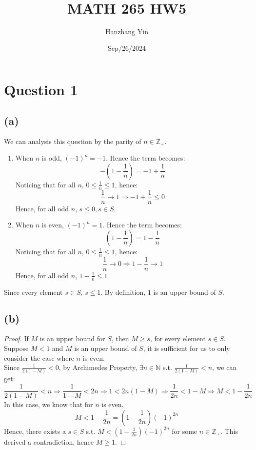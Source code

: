 \documentclass{article}
\title{MATH 265 HW5}
\author{Hanzhang Yin}
\date{Sep/26/2024}
\begin{document}
\maketitle

\section*{Question 1}

\subsection*{(a)}
We can analysis this question by the parity of $n \in \mathbb{Z}_{+}$.
\begin{enumerate}
    \item When $n$ is odd, \((-1)^n = -1 \). Hence the term becomes:
    \[ - \left( 1 - \frac{1}{n} \right) = -1 + \frac{1}{n} \]
    Noticing that for all $n$, $0 \leq \frac{1}{n} \leq 1$, hence:
    \[ \frac{1}{n} \rightarrow 1 \Rightarrow -1 + \frac{1}{n} \leq 0 \]
    Hence, for all odd $n$, \( s \leq 0, s \in S \).
    \item When $n$ is even, \((-1)^n = 1 \). Hence the term becomes:
    \[ \left( 1 - \frac{1}{n} \right) = 1 - \frac{1}{n} \]
    Noticing that for all $n$, $0 \leq \frac{1}{n} \leq 1$, hence:
    \[ \frac{1}{n} \rightarrow 0 \Rightarrow 1 - \frac{1}{n} \rightarrow 1 \]
    Hence, for all odd $n$, \( 1 - \frac{1}{n} \leq 1 \)
\end{enumerate}
Since every element $s \in S$, $s \leq 1$. By definition, $1$ is an upper bound of $S$.

\subsection*{(b)}

\begin{proof}
    If $M$ is an upper bound for $S$, then $M \geq s$, for every element $s \in S$.
    \\
    Suppose $M < 1$ and $M$ is an upper bound of $S$, it is sufficient for us to only consider the case where $n$ is even.
    \\
    Since \( \frac{1}{2(1-M)} < 0 \), by Archimedes Property, \( \exists n \in \mathbb{N} \) s.t. \( \frac{1}{2(1-M)} < n \), we can get:
    \[ \frac{1}{2(1-M)} < n \Rightarrow \frac{1}{1 - M} < 2n \Rightarrow 1 < 2n(1 - M) \Rightarrow \frac{1}{2n} < 1 - M \Rightarrow M < 1 - \frac{1}{2n} \]
    In this case, we know that for $n$ is even,
    \[ M < 1 - \frac{1}{2n} = (1 - \frac{1}{2n})(-1)^{2n} \]
    Hence, there exists a $s \in S$ s.t. $M < (1 - \frac{1}{2n})(-1)^{2n}$ for some $n \in \mathbb{Z}_{+}$.
    This derived a contradiction, hence $M \geq 1$.
\end{proof}
\end{document}
